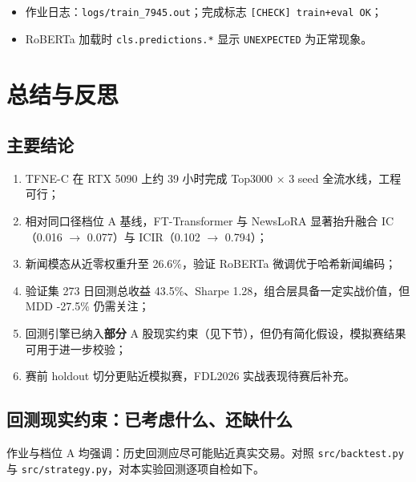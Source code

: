\documentclass[UTF8,a4paper,12pt]{ctexart}
\begin{document}
\begin{itemize}[leftmargin=2em]
  \item 作业日志：\texttt{logs/train\_7945.out}；完成标志 \texttt{[CHECK] train+eval OK}；
  \item RoBERTa 加载时 \texttt{cls.predictions.*} 显示 \texttt{UNEXPECTED} 为正常现象。
\end{itemize}

\section{总结与反思}

\subsection{主要结论}

\begin{enumerate}[leftmargin=2em]
  \item TFNE-C 在 RTX 5090 上约 39 小时完成 Top3000 × 3 seed 全流水线，工程可行；
  \item 相对同口径档位 A 基线，FT-Transformer 与 NewsLoRA 显著抬升融合 IC（0.016 $\to$ 0.077）与 ICIR（0.102 $\to$ 0.794）；
  \item 新闻模态从近零权重升至 26.6\%，验证 RoBERTa 微调优于哈希新闻编码；
  \item 验证集 273 日回测总收益 43.5\%、Sharpe 1.28，组合层具备一定实战价值，但 MDD -27.5\% 仍需关注；
  \item 回测引擎已纳入\textbf{部分} A 股现实约束（见下节），但仍有简化假设，模拟赛结果可用于进一步校验；
  \item 赛前 holdout 切分更贴近模拟赛，FDL2026 实战表现待赛后补充。
\end{enumerate}

\subsection{回测现实约束：已考虑什么、还缺什么}

作业与档位 A 均强调：历史回测应尽可能贴近真实交易。对照 \texttt{src/backtest.py} 与 \texttt{src/strategy.py}，对本实验回测逐项自检如下。
\end{document}
